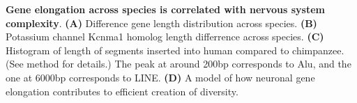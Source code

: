 \textbf{Gene elongation across species is correlated with nervous system complexity}.
\textbf{(A)} Difference gene length distribution across species.
\textbf{(B)} Potassium channel Kcnma1 homolog length differrence across species.
\textbf{(C)} Histogram of length of segments inserted into human compared to chimpanzee. (See method for details.) The peak at around 200bp corresponds to Alu, and the one at 6000bp corresponds to LINE.
\textbf{(D)} A model of how neuronal gene elongation contributes to efficient creation of diversity. 
